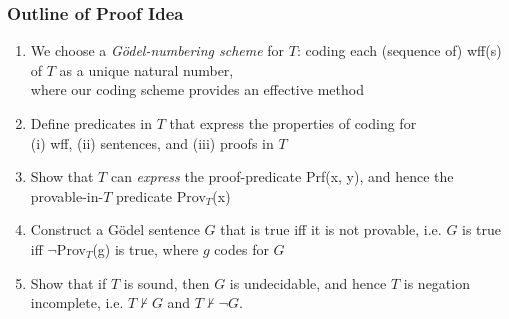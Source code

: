 \begin{frame}
\frametitle{Outline of Proof Idea}

\begin{enumerate}[<+->]

\item We choose a \textit{G\"odel-numbering scheme} for $T$: coding each (sequence of) wff(s) of $T$ as a unique natural number, \\ where our coding scheme provides an effective method %

\item Define predicates in $T$ that express the properties of coding for \\ (i) wff, (ii) sentences, and (iii) proofs in $T$

\item Show that $T$ can \textit{express} the proof-predicate \textrm{Prf(x, y)}, and hence the provable-in-$T$ predicate \textrm{Prov}$_T$(x) %

\item Construct a G\"odel sentence $G$ that is true iff it is not provable, i.e. $G$ is true iff $\neg$\textrm{Prov}$_T$(g) is true, where $g$ codes for $G$

\item Show that if $T$ is sound, then $G$ is undecidable, and hence $T$ is negation incomplete, i.e. $T \nvdash G$ and $T \nvdash \neg G$.

\end{enumerate}
\end{frame}

